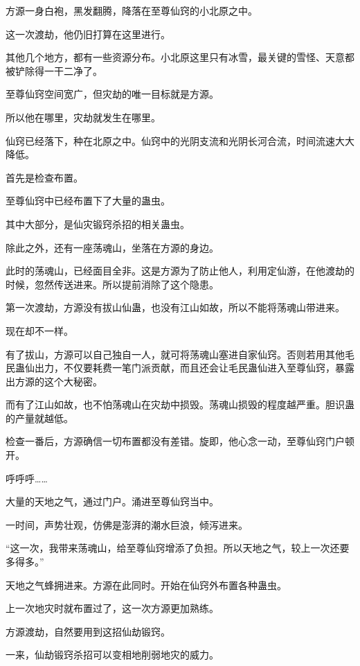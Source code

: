 
\begin{this_body}



方源一身白袍，黑发翻腾，降落在至尊仙窍的小北原之中。

这一次渡劫，他仍旧打算在这里进行。

其他几个地方，都有一些资源分布。小北原这里只有冰雪，最关键的雪怪、天意都被铲除得一干二净了。

至尊仙窍空间宽广，但灾劫的唯一目标就是方源。

所以他在哪里，灾劫就发生在哪里。

仙窍已经落下，种在北原之中。仙窍中的光阴支流和光阴长河合流，时间流速大大降低。

首先是检查布置。

至尊仙窍中已经布置下了大量的蛊虫。

其中大部分，是仙灾锻窍杀招的相关蛊虫。

除此之外，还有一座荡魂山，坐落在方源的身边。

此时的荡魂山，已经面目全非。这是方源为了防止他人，利用定仙游，在他渡劫的时候，忽然传送进来。所以提前消除了这个隐患。

第一次渡劫，方源没有拔山仙蛊，也没有江山如故，所以不能将荡魂山带进来。

现在却不一样。

有了拔山，方源可以自己独自一人，就可将荡魂山塞进自家仙窍。否则若用其他毛民蛊仙出力，不仅要耗费一笔门派贡献，而且还会让毛民蛊仙进入至尊仙窍，暴露出方源的这个大秘密。

而有了江山如故，也不怕荡魂山在灾劫中损毁。荡魂山损毁的程度越严重。胆识蛊的产量就越低。

检查一番后，方源确信一切布置都没有差错。旋即，他心念一动，至尊仙窍门户顿开。

呼呼呼……

大量的天地之气，通过门户。涌进至尊仙窍当中。

一时间，声势壮观，仿佛是澎湃的潮水巨浪，倾泻进来。

“这一次，我带来荡魂山，给至尊仙窍增添了负担。所以天地之气，较上一次还要多得多。”

天地之气蜂拥进来。方源在此同时。开始在仙窍外布置各种蛊虫。

上一次地灾时就布置过了，这一次方源更加熟练。

方源渡劫，自然要用到这招仙劫锻窍。

一来，仙劫锻窍杀招可以变相地削弱地灾的威力。


\end{this_body}
